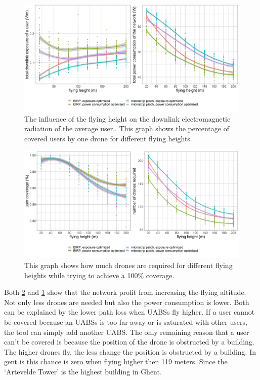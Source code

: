 \begin{figure}[]
  \includegraphics[width=\textwidth]{../results/s3/fhvsdlAndPc.png}
  \caption{The influence of the flying height on the downlink electromagnetic radiation of the average user.. This graph shows the percentage of covered users by one drone for different flying heights.}
  \label{fig:s3a_dlAndPc}
\end{figure}

\begin{figure}[]
  \includegraphics[width=\textwidth]{../results/s3/fhvsnumdronesAndCov.png}
  \caption{This graph shows how much drones are required for different flying heights while trying to achieve a 100\% coverage.}
  \label{fig:s3a_numDronesAndCov}
\end{figure}

Both \ref{fig:s3a_numDronesAndCov} and \ref{fig:s3a_dlAndPc} show that the network profit from increasing the flying altitude. 
Not only less drones are needed but also the power consumption is lower. Both can be explained by the lower path loss when \gls{UABS}s fly higher.
If a user cannot be covered because an \gls{UABS}s is too far away or is saturated with other users, 
the tool can simply add another \gls{UABS}. The only remaining reason that a user can’t be covered is because the position of 
the drone is obstructed by a building. The higher drones fly, the less change the position is obstructed by a building. 
In gent is this chance is zero when flying higher then 119 meters. Since the `Artevelde Tower' is the highest building in Ghent.

